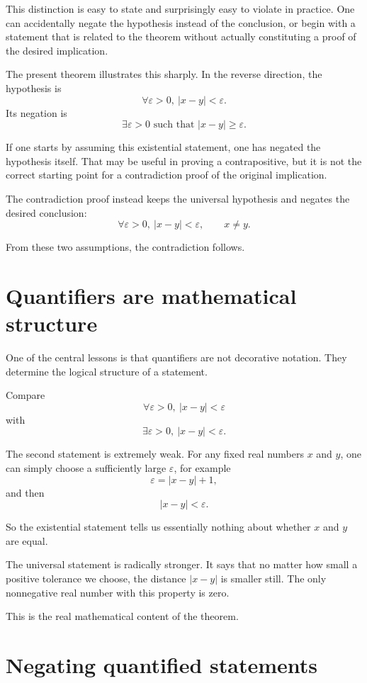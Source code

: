 \documentclass{essay}
\begin{document}
This distinction is easy to state and surprisingly easy to violate in practice. One can accidentally negate the hypothesis instead of the conclusion, or begin with a statement that is related to the theorem without actually constituting a proof of the desired implication.

The present theorem illustrates this sharply. In the reverse direction, the hypothesis is
\[ \forall \varepsilon>0,\ |x-y|<\varepsilon. \]
Its negation is
\[ \exists \varepsilon>0 \text{ such that } |x-y|\ge\varepsilon. \]

If one starts by assuming this existential statement, one has negated the hypothesis itself. That may be useful in proving a contrapositive, but it is not the correct starting point for a contradiction proof of the original implication.

The contradiction proof instead keeps the universal hypothesis and negates the desired conclusion:
\[ \forall \varepsilon>0,\ |x-y|<\varepsilon, \qquad x\ne y. \]

From these two assumptions, the contradiction follows.

\section{Quantifiers are mathematical structure}

One of the central lessons is that quantifiers are not decorative notation. They determine the logical structure of a statement.

Compare
\[ \forall \varepsilon>0,\ |x-y|<\varepsilon \]
with
\[ \exists \varepsilon>0,\ |x-y|<\varepsilon. \]

The second statement is extremely weak. For any fixed real numbers \(x\) and \(y\), one can simply choose a sufficiently large \(\varepsilon\), for example
\[ \varepsilon=|x-y|+1, \]
and then
\[ |x-y|<\varepsilon. \]

So the existential statement tells us essentially nothing about whether \(x\) and \(y\) are equal.

The universal statement is radically stronger. It says that no matter how small a positive tolerance we choose, the distance \(|x-y|\) is smaller still. The only nonnegative real number with this property is zero.

This is the real mathematical content of the theorem.

\section{Negating quantified statements}
\end{document}
